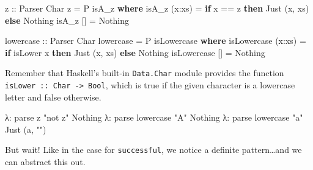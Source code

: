 \documentclass[]{article}
\newenvironment{Shaded}{}{}
\newcommand{\CharTok}[1]{\textcolor[rgb]{0.25,0.44,0.63}{#1}}
\newcommand{\DataTypeTok}[1]{\textcolor[rgb]{0.56,0.13,0.00}{#1}}
\newcommand{\FunctionTok}[1]{\textcolor[rgb]{0.02,0.16,0.49}{#1}}
\newcommand{\KeywordTok}[1]{\textcolor[rgb]{0.00,0.44,0.13}{\textbf{#1}}}
\newcommand{\NormalTok}[1]{#1}
\newcommand{\OperatorTok}[1]{\textcolor[rgb]{0.40,0.40,0.40}{#1}}
\newcommand{\OtherTok}[1]{\textcolor[rgb]{0.00,0.44,0.13}{#1}}
\newcommand{\StringTok}[1]{\textcolor[rgb]{0.25,0.44,0.63}{#1}}
\begin{document}
\begin{Shaded}
\begin{Highlighting}[]
\OtherTok{z ::} \DataTypeTok{Parser} \DataTypeTok{Char}
\NormalTok{z }\OtherTok{=} \DataTypeTok{P}\NormalTok{ isA\_z}
    \KeywordTok{where}
\NormalTok{        isA\_z (x}\OperatorTok{:}\NormalTok{xs) }\OtherTok{=}  \KeywordTok{if}\NormalTok{ x }\OperatorTok{==} \CharTok{\textquotesingle{}z\textquotesingle{}}
                            \KeywordTok{then} \DataTypeTok{Just}\NormalTok{ (x, xs)}
                            \KeywordTok{else} \DataTypeTok{Nothing}
\NormalTok{        isA\_z []     }\OtherTok{=}  \DataTypeTok{Nothing}

\OtherTok{lowercase ::} \DataTypeTok{Parser} \DataTypeTok{Char}
\NormalTok{lowercase }\OtherTok{=} \DataTypeTok{P}\NormalTok{ isLowercase}
    \KeywordTok{where}
\NormalTok{        isLowercase (x}\OperatorTok{:}\NormalTok{xs)  }\OtherTok{=}   \KeywordTok{if} \FunctionTok{isLower}\NormalTok{ x}
                                    \KeywordTok{then} \DataTypeTok{Just}\NormalTok{ (x, xs)}
                                    \KeywordTok{else} \DataTypeTok{Nothing}
\NormalTok{        isLowercase []      }\OtherTok{=}   \DataTypeTok{Nothing}
\end{Highlighting}
\end{Shaded}

Remember that Haskell's built-in \texttt{Data.Char} module provides the function
\texttt{isLower\ ::\ Char\ -\textgreater{}\ Bool}, which is true if the given
character is a lowercase letter and false otherwise.

\begin{Shaded}
\begin{Highlighting}[]
\NormalTok{λ}\OperatorTok{:}\NormalTok{ parse z }\StringTok{"not z"}
\DataTypeTok{Nothing}
\NormalTok{λ}\OperatorTok{:}\NormalTok{ parse lowercase }\StringTok{"A"}
\DataTypeTok{Nothing}
\NormalTok{λ}\OperatorTok{:}\NormalTok{ parse lowercase }\StringTok{"a"}
\DataTypeTok{Just}\NormalTok{ (}\CharTok{\textquotesingle{}a\textquotesingle{}}\NormalTok{, }\StringTok{""}\NormalTok{)}
\end{Highlighting}
\end{Shaded}

But wait! Like in the case for \texttt{successful}, we notice a definite
pattern\ldots and we can abstract this out.
\end{document}
